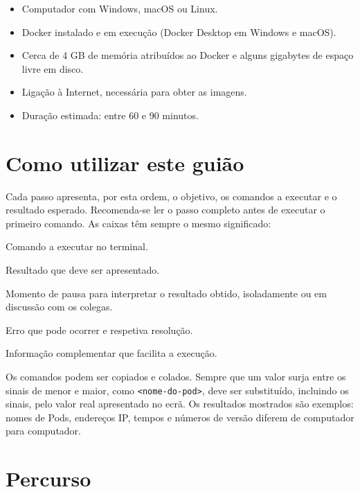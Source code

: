 \documentclass[11pt,a4paper]{article}
\newcommand{\cmd}[1]{\texttt{#1}}
\begin{document}
\begin{itemize}
  \item Computador com Windows, macOS ou Linux.
  \item Docker instalado e em execução (Docker Desktop em Windows e macOS).
  \item Cerca de 4 GB de memória atribuídos ao Docker e alguns gigabytes de espaço livre em disco.
  \item Ligação à Internet, necessária para obter as imagens.
  \item Duração estimada: entre 60 e 90 minutos.
\end{itemize}

\section*{Como utilizar este guião}

Cada passo apresenta, por esta ordem, o objetivo, os comandos a executar e o resultado esperado. Recomenda-se ler o passo completo antes de executar o primeiro comando. As caixas têm sempre o mesmo significado:

\begin{terminal}
Comando a executar no terminal.
\end{terminal}

\begin{saida}
Resultado que deve ser apresentado.
\end{saida}

\begin{observe}
Momento de pausa para interpretar o resultado obtido, isoladamente ou em discussão com os colegas.
\end{observe}

\begin{erro}
Erro que pode ocorrer e respetiva resolução.
\end{erro}

\begin{nota}
Informação complementar que facilita a execução.
\end{nota}

Os comandos podem ser copiados e colados. Sempre que um valor surja entre os sinais de menor e maior, como \cmd{<nome-do-pod>}, deve ser substituído, incluindo os sinais, pelo valor real apresentado no ecrã. Os resultados mostrados são exemplos: nomes de Pods, endereços IP, tempos e números de versão diferem de computador para computador.

\section*{Percurso}
\end{document}
